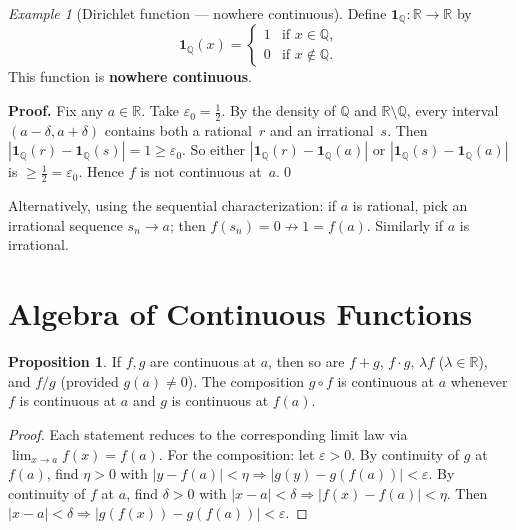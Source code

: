 \documentclass[12pt,a4paper,openany]{book}
\theoremstyle{definition}
\newtheorem{proposition}{Proposition}[chapter]
\theoremstyle{remark}
\newtheorem{example}{Example}[chapter]
\begin{document}
\begin{example}[Dirichlet function --- nowhere continuous]
\label{ex:dirichlet}
Define $\mathbf{1}_{\mathbb{Q}}\colon\mathbb{R}\to\mathbb{R}$ by
\[
  \mathbf{1}_{\mathbb{Q}}(x) =
  \begin{cases} 1 & \text{if } x\in\mathbb{Q},\\
                 0 & \text{if } x\notin\mathbb{Q}.
  \end{cases}
\]
This function is \textbf{nowhere continuous}.

\medskip\noindent
\textbf{Proof.}\;
Fix any $a\in\mathbb{R}$.  Take $\varepsilon_0=\tfrac{1}{2}$.
By the density of $\mathbb{Q}$ and $\mathbb{R}\setminus\mathbb{Q}$,
every interval $(a-\delta,a+\delta)$ contains both a rational~$r$ and an
irrational~$s$.  Then $|\mathbf{1}_{\mathbb{Q}}(r)-\mathbf{1}_{\mathbb{Q}}(s)|=1\ge\varepsilon_0$.
So either $|\mathbf{1}_{\mathbb{Q}}(r)-\mathbf{1}_{\mathbb{Q}}(a)|$
or $|\mathbf{1}_{\mathbb{Q}}(s)-\mathbf{1}_{\mathbb{Q}}(a)|$ is
$\ge\tfrac12=\varepsilon_0$.  Hence $f$ is not continuous at~$a$.\qed

\medskip
Alternatively, using the sequential characterization: if $a$ is
rational, pick an irrational sequence $s_n\to a$; then
$f(s_n)=0\not\to 1=f(a)$.  Similarly if $a$ is irrational.
\end{example}

\section{Algebra of Continuous Functions}

\begin{proposition}\label{prop:algebra-cont}
If $f,g$ are continuous at $a$, then so are $f+g$, $f\cdot g$,
$\lambda f$ ($\lambda\in\mathbb{R}$), and $f/g$ (provided $g(a)\neq 0$).
The composition $g\circ f$ is continuous at $a$ whenever $f$ is
continuous at $a$ and $g$ is continuous at $f(a)$.
\end{proposition}

\begin{proof}
Each statement reduces to the corresponding limit law via
$\lim_{x\to a}f(x)=f(a)$.  For the composition: let $\varepsilon>0$.
By continuity of $g$ at $f(a)$, find $\eta>0$ with
$|y-f(a)|<\eta\Rightarrow|g(y)-g(f(a))|<\varepsilon$.  By continuity
of $f$ at $a$, find $\delta>0$ with
$|x-a|<\delta\Rightarrow|f(x)-f(a)|<\eta$.  Then
$|x-a|<\delta\Rightarrow|g(f(x))-g(f(a))|<\varepsilon$.
\end{proof}
\end{document}
